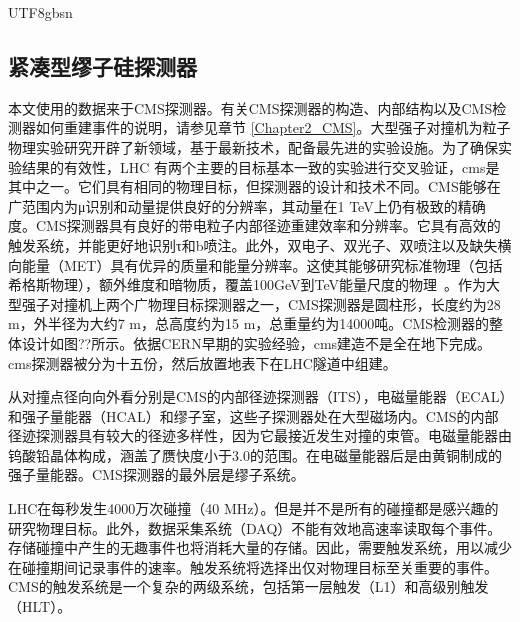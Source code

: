\begin{CJK}{UTF8}{gbsn}
	\subsection{紧凑型缪子硅探测器}\label{cms_chinese}
	本文使用的数据来于CMS探测器。有关CMS探测器的构造、内部结构以及CMS检测器如何重建事件的说明，请参见章节 \ref{Chapter2_CMS}。大型强子对撞机为粒子物理实验研究开辟了新领域，基于最新技术，配备最先进的实验设施。为了确保实验结果的有效性，LHC 有两个主要的目标基本一致的实验进行交叉验证，cms是其中之一。它们具有相同的物理目标，但探测器的设计和技术不同。CMS能够在广范围内为μ识别和动量提供良好的分辨率，其动量在1 TeV上仍有极致的精确度。CMS探测器具有良好的带电粒子内部径迹重建效率和分辨率。它具有高效的触发系统，并能更好地识别τ和b喷注。此外，双电子、双光子、双喷注以及缺失横向能量（MET）具有优异的质量和能量分辨率。这使其能够研究标准物理（包括希格斯物理），额外维度和暗物质，覆盖100GeV到TeV能量尺度的物理~\cite{Reference34}。作为大型强子对撞机上两个广物理目标探测器之一，CMS探测器是圆柱形，长度约为28 m，外半径为大约7 m，总高度约为15 m，总重量约为14000吨。CMS检测器的整体设计如图??所示。依据CERN早期的实验经验，cms建造不是全在地下完成。cms探测器被分为十五份，然后放置地表下在LHC隧道中组建。
\par 从对撞点径向向外看分别是CMS的内部径迹探测器（ITS），电磁量能器（ECAL）和强子量能器（HCAL）和缪子室，这些子探测器处在大型磁场内。CMS的内部径迹探测器具有较大的径迹多样性，因为它最接近发生对撞的束管。电磁量能器由钨酸铅晶体构成，涵盖了赝快度小于3.0的范围。在电磁量能器后是由黄铜制成的强子量能器。CMS探测器的最外层是缪子系统。
\par LHC在每秒发生4000万次碰撞（40 MHz）。但是并不是所有的碰撞都是感兴趣的研究物理目标。此外，数据采集系统（DAQ）不能有效地高速率读取每个事件。存储碰撞中产生的无趣事件也将消耗大量的存储。因此，需要触发系统，用以减少在碰撞期间记录事件的速率。触发系统将选择出仅对物理目标至关重要的事件。CMS的触发系统是一个复杂的两级系统，包括第一层触发（L1）和高级别触发（HLT）。

\end{CJK}
